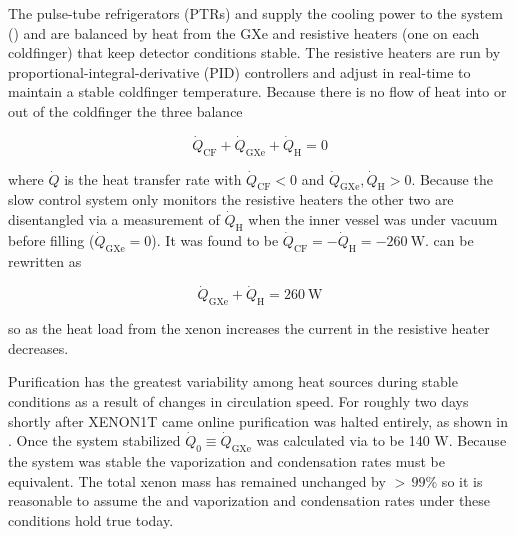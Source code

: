 The pulse-tube refrigerators (PTRs) and  supply the cooling power to the system () and are balanced
by heat from the GXe and resistive heaters (one on each coldfinger) that keep detector conditions stable.  The resistive heaters are run
by proportional-integral-derivative (PID) controllers and adjust in real-time to maintain a stable coldfinger temperature.  Because there
is no flow of heat into or out of the coldfinger the three balance

\vspace{-10pt}

\begin{equation}
\dot{Q}_{\mathrm{CF}} + \dot{Q}_{\mathrm{GXe}} + \dot{Q}_{\mathrm{H}} = 0
\label{eq:electron_lifetime_model_vap_and_cond_heat_cons}
\end{equation}

\noindent where $\dot{Q}$ is the heat transfer rate with $\dot{Q}_{\mathrm{CF}} < 0$ and
$\dot{Q}_{\mathrm{GXe}}, \dot{Q}_{\mathrm{H}} > 0$.  Because the slow control system only monitors the resistive heaters the
other two are disentangled via a measurement of $\dot{Q}_{\mathrm{H}}$ when the inner vessel was under vacuum before filling
($\dot{Q}_{\mathrm{GXe}} = 0$).  It was found
to be $\dot{Q}_{\mathrm{CF}} = -\dot{Q}_{\mathrm{H}} = -260\ \mathrm{W}$.   can
be rewritten as

\vspace{-10pt}

\begin{equation}
\dot{Q}_{\mathrm{GXe}} + \dot{Q}_{\mathrm{H}} = 260\ \mathrm{W}
\label{eq:electron_lifetime_model_vap_and_cond_heat_gxe}
\end{equation}

\noindent so as the heat load from the xenon increases the current in the resistive heater decreases.

Purification has the greatest variability among heat sources during stable conditions as a result of changes in circulation speed.  For
roughly two days shortly after XENON1T came online purification was halted entirely, as shown in
.  Once the system stabilized $\dot{Q}_0 \equiv \dot{Q}_{\mathrm{GXe}}$ was
calculated via
 to be 140 W.  Because the system was stable the vaporization and condensation
rates must be equivalent.  The total xenon mass has remained unchanged by ${>}\, 99\%$ so it is reasonable to assume the \qdh and
vaporization and condensation rates under these conditions hold true today.

